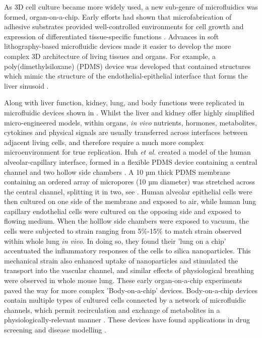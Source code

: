 As 3D cell culture became more widely used, a new sub-genre of microfluidics was formed, organ-on-a-chip. Early efforts had shown
that microfabrication of adhesive substrates provided well-controlled environments for cell growth and expression of differentiated tissue-specific functions
\citep{chen1997geometric,bhatia1999effect}. Advances in soft lithography-based microfluidic devices made it easier
to develop the more complex 3D architecture of living tissues and organs. For example, a poly(dimethylsiloxane) (PDMS) device was developed
that contained structures which mimic the structure of the endothelial-epithelial interface that forms the liver sinusoid \citep{nakao2011bile}.

Along with liver function, kidney, lung, and body functions were replicated in microfluidic devices shown in . Whilst the liver and kidney offer highly
simplified micro-engineered models, within organs, \textit{in vivo} nutrients, hormones, metabolites, cytokines and physical signals are usually transferred across interfaces
between adjacent living cells, and therefore require a much more complex microenvironment
for true replication. Huh \textit{et al.} created a model of the human alveolar-capillary interface, formed in a flexible
PDMS device containing a central channel and two hollow side chambers \citep{huh2010reconstituting}. A 10 µm thick PDMS membrane containing an
ordered array of micropores (10 µm diameter) was stretched across the central channel, splitting it in two, see .
Human alveolar epithelial cells were then cultured on
one side of the membrane and exposed to air, while human lung capillary endothelial cells were cultured on the opposing side and exposed to flowing
medium. When the holllow side chambers were exposed to vacuum, the cells were subjected to strain ranging from 5\%-15\% to match strain observed within
whole lung \textit{in vivo}. In doing so, they found their 'lung on a chip' accentuated the inflammatory responses of the cells to silica
nanoparticles. This mechanical strain also enhanced uptake of nanoparticles and stimulated the transport into the vascular channel, and
similar effects of physiological breathing were observed in whole mouse lung. These early organ-on-a-chip experiments paved the way for more complex
'Body-on-a-chip' devices. Body-on-a-chip devices contain multiple types of cultured cells connected by a network of
microfluidic channels, which permit recirculation and exchange of metabolites in a physiologically-relevant manner \citep{esch2011role}. These devices
have found applications in drug screening and disease modelling \citep{skardal2016organoid}.


